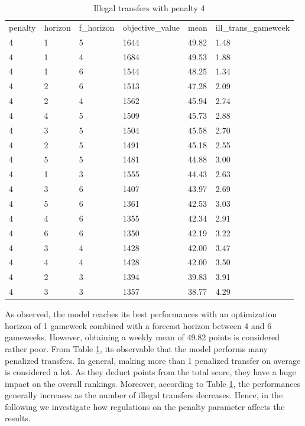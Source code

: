 \begin{table}[H]
\centering
\caption{Illegal transfers with penalty 4}
\label{tab:pen_4_ill_trans}
\begin{tabular}{llllll}
penalty & horizon & f\_horizon & objective\_value & mean  & ill\_trans\_gameweek \\
4       & 1       & 5          & 1644             & 49.82 & 1.48       \\
4       & 1       & 4          & 1684             & 49.53 & 1.88       \\
4       & 1       & 6          & 1544             & 48.25 & 1.34       \\
4       & 2       & 6          & 1513             & 47.28 & 2.09       \\
4       & 2       & 4          & 1562             & 45.94 & 2.74       \\
4       & 4       & 5          & 1509             & 45.73 & 2.88       \\
4       & 3       & 5          & 1504             & 45.58 & 2.70       \\
4       & 2       & 5          & 1491             & 45.18 & 2.55       \\
4       & 5       & 5          & 1481             & 44.88 & 3.00       \\
4       & 1       & 3          & 1555             & 44.43 & 2.63       \\
4       & 3       & 6          & 1407             & 43.97 & 2.69       \\
4       & 5       & 6          & 1361             & 42.53 & 3.03       \\
4       & 4       & 6          & 1355             & 42.34 & 2.91       \\
4       & 6       & 6          & 1350             & 42.19 & 3.22       \\
4       & 3       & 4          & 1428             & 42.00 & 3.47       \\
4       & 4       & 4          & 1428             & 42.00 & 3.50       \\
4       & 2       & 3          & 1394             & 39.83 & 3.91       \\
4       & 3       & 3          & 1357             & 38.77 & 4.29      
\end{tabular}
\end{table}


As observed, the model reaches its best performances  with an optimization horizon of 1 gameweek combined with a forecast horizon between 4 and 6 gameweeks. 
However, obtaining a weekly mean of 49.82 points is considered rather poor. From Table \ref{tab:pen_4_ill_trans}, its observable that the model performs many penalized transfers.  In general, making more than 1 penalized transfer on average is considered a lot. As they deduct points from the total score, they have a huge impact on the overall rankings. Moreover, according to Table \ref{tab:pen_4_ill_trans}, the performances generally increases as the number of illegal transfers decreases. Hence, in the following we investigate how regulations on the penalty parameter affects the results.  

